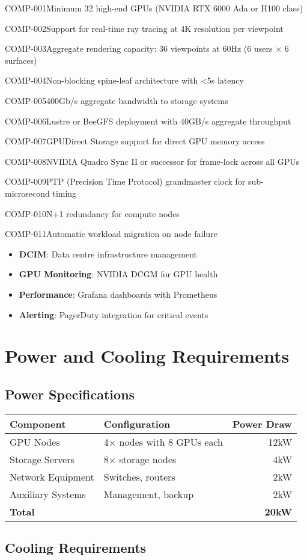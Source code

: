 \begin{requirement}{COMP-001}{Minimum 32 high-end GPUs (NVIDIA RTX 6000 Ada or H100 class)}
\begin{requirement}{COMP-002}{Support for real-time ray tracing at 4K resolution per viewpoint}
\begin{requirement}{COMP-003}{Aggregate rendering capacity: 36 viewpoints at 60Hz (6 users × 6 surfaces)}
\begin{requirement}{COMP-004}{Non-blocking spine-leaf architecture with <5\textmu s latency}
\begin{requirement}{COMP-005}{400Gb/s aggregate bandwidth to storage systems}
\begin{requirement}{COMP-006}{Lustre or BeeGFS deployment with 40GB/s aggregate throughput}
\begin{requirement}{COMP-007}{GPUDirect Storage support for direct GPU memory access}
\begin{requirement}{COMP-008}{NVIDIA Quadro Sync II or successor for frame-lock across all GPUs}
\begin{requirement}{COMP-009}{PTP (Precision Time Protocol) grandmaster clock for sub-microsecond timing}
\begin{requirement}{COMP-010}{N+1 redundancy for compute nodes}
\begin{requirement}{COMP-011}{Automatic workload migration on node failure}
\begin{itemize}
    \item \textbf{DCIM}: Data centre infrastructure management
    \item \textbf{GPU Monitoring}: NVIDIA DCGM for GPU health
    \item \textbf{Performance}: Grafana dashboards with Prometheus
    \item \textbf{Alerting}: PagerDuty integration for critical events
\end{itemize}

\section{Power and Cooling Requirements}

\subsection{Power Specifications}

\begin{table}[H]
\centering
\begin{tabularx}{\textwidth}{@{}lXr@{}}
\toprule
\textbf{Component} & \textbf{Configuration} & \textbf{Power Draw} \\
\midrule
GPU Nodes & 4× nodes with 8 GPUs each & 12kW \\
Storage Servers & 8× storage nodes & 4kW \\
Network Equipment & Switches, routers & 2kW \\
Auxiliary Systems & Management, backup & 2kW \\
\midrule
\textbf{Total} & & \textbf{20kW} \\
\bottomrule
\end{tabularx}
\end{table}

\subsection{Cooling Requirements}


\end{requirement}
\end{requirement}
\end{requirement}
\end{requirement}
\end{requirement}
\end{requirement}
\end{requirement}
\end{requirement}
\end{requirement}
\end{requirement}
\end{requirement}
